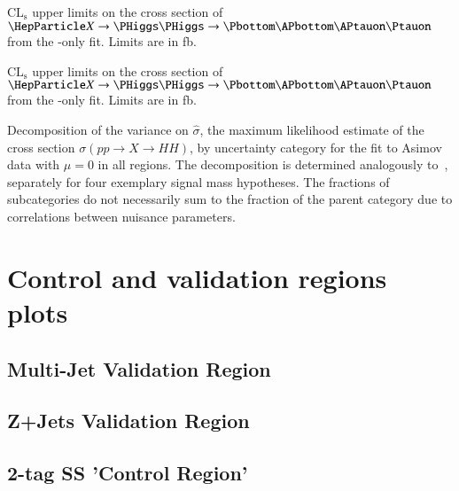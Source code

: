 \begin{table}[htbp]
  \centering

  
  \caption{$\text{CL}_\text{s}$ upper limits on the cross section of
    $\PX \ra \PHiggs \PHiggs \ra \bbtautau$ from the \hadhad-only
    fit. Limits are in fb.}
  \label{tab:hadhad_limits_resonant}
\end{table}


\begin{table}[htbp]
  \centering

  
  \caption{$\text{CL}_\text{s}$ upper limits on the cross section of
    $\PX \ra \PHiggs \PHiggs \ra \bbtautau$ from the \lephad-only
    fit. Limits are in fb.}
  \label{tab:lephad_limits_resonant}
\end{table}


\label{app:breakdown_table}

\begin{table}[htbp]
  \centering

  \caption{Decomposition of the variance on $\hat{\sigma}$, the
    maximum likelihood estimate of the cross section
    $\sigma(pp \to X\to HH)$, by uncertainty category for the fit to
    Asimov data with $\mu = 0$ in all regions. The decomposition is
    determined analogously to~, separately
    for four exemplary signal mass hypotheses. The fractions of
    subcategories do not necessarily sum to the fraction of the parent
    category due to correlations between nuisance parameters.}%
  \label{tab:breakdown_res_exp_mu0}

  
\end{table}


\chapter{Control and validation regions plots}
\label{app:control_and_validation_regions}


\section{Multi-Jet Validation Region}

\section{Z+Jets Validation Region}

\section{2-tag SS 'Control Region'}

